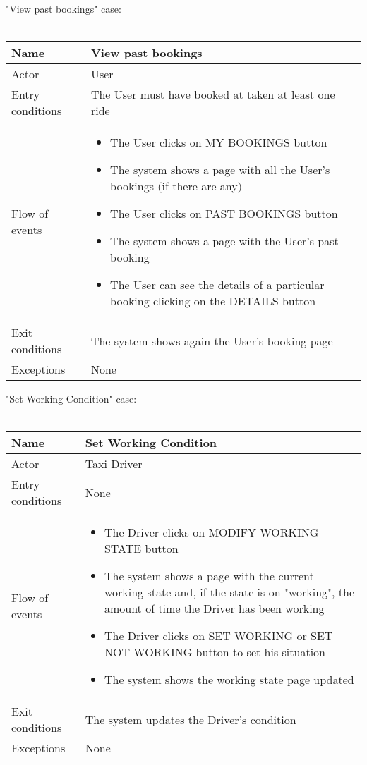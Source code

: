 \newpage
"View past bookings" case:
\\
\\
\begin{tabular}{|l|p{10cm}|} 
\hline
Name & View past bookings\\
\hline
Actor & User\\
\hline
Entry conditions & The User must have booked at taken at least one ride\\
\hline
Flow of events &
	\begin{itemize}
		\item The User clicks on MY BOOKINGS button
		\item The system shows a page with all the User's bookings $($if there are any$)$
		\item The User clicks on PAST BOOKINGS button
		\item The system shows a page with the User's past booking
		\item The User can see the details of a particular booking clicking on the DETAILS button
	\end{itemize}\\
	
\hline
Exit conditions & The system shows again the User's booking page\\
\hline
Exceptions & None\\
\hline
\end {tabular}

\newpage
"Set Working Condition" case:
\\
\\
\begin{tabular}{|l|p{10cm}|} 
\hline
Name & Set Working Condition\\
\hline
Actor & Taxi Driver\\
\hline
Entry conditions & None\\
\hline
Flow of events &
	\begin{itemize}
		\item The Driver clicks on MODIFY WORKING STATE button
		\item The system shows a page with the current working state and, if the state is on "working", the amount of time the Driver has been working
		\item The Driver clicks on SET WORKING or SET NOT WORKING button to set his situation
		\item The system shows the working state page updated
	\end{itemize}\\
	
\hline
Exit conditions & The system updates the Driver's condition\\
\hline
Exceptions & None\\
\hline
\end {tabular}



